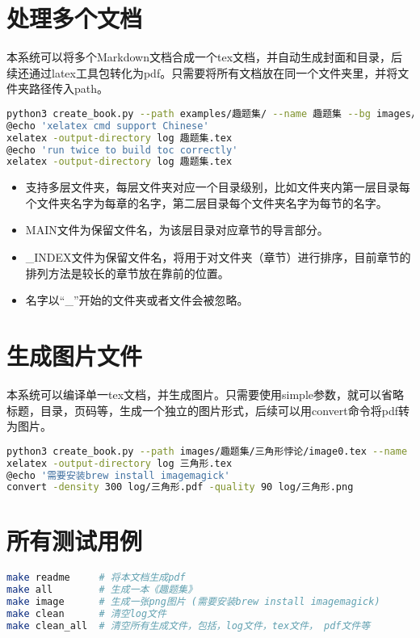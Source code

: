 \documentclass[12pt, letterpaper]{ctexrep}
\begin{document}
\section{处理多个文档}
本系统可以将多个Markdown文档合成一个tex文档，并自动生成封面和目录，后续还通过latex工具包转化为pdf。只需要将所有文档放在同一个文件夹里，并将文件夹路径传入path。


\begin{lstlisting}[language=Bash]
python3 create_book.py --path examples/趣题集/ --name 趣题集 --bg images/趣题集/background.jpeg --author 南方小智
@echo 'xelatex cmd support Chinese'
xelatex -output-directory log 趣题集.tex
@echo 'run twice to build toc correctly'
xelatex -output-directory log 趣题集.tex
\end{lstlisting}


\begin{itemize}
\item{ 支持多层文件夹，每层文件夹对应一个目录级别，比如文件夹内第一层目录每个文件夹名字为每章的名字，第二层目录每个文件夹名字为每节的名字。 }
\item{ MAIN文件为保留文件名，为该层目录对应章节的导言部分。 }
\item{ \_INDEX文件为保留文件名，将用于对文件夹（章节）进行排序，目前章节的排列方法是较长的章节放在靠前的位置。 }
\item{ 名字以“\_”开始的文件夹或者文件会被忽略。 }
\end{itemize}


\section{生成图片文件}
本系统可以编译单一tex文档，并生成图片。只需要使用simple参数，就可以省略标题，目录，页码等，生成一个独立的图片形式，后续可以用convert命令将pdf转为图片。

\begin{lstlisting}[language=Bash]
python3 create_book.py --path images/趣题集/三角形悖论/image0.tex --name 三角形 --simple
xelatex -output-directory log 三角形.tex
@echo '需要安装brew install imagemagick'
convert -density 300 log/三角形.pdf -quality 90 log/三角形.png
\end{lstlisting}

\section{所有测试用例}
\begin{lstlisting}[language=Bash]
make readme     # 将本文档生成pdf
make all        # 生成一本《趣题集》
make image      # 生成一张png图片 (需要安装brew install imagemagick)
make clean      # 清空log文件
make clean_all  # 清空所有生成文件，包括，log文件，tex文件， pdf文件等
\end{lstlisting}
\end{document}
